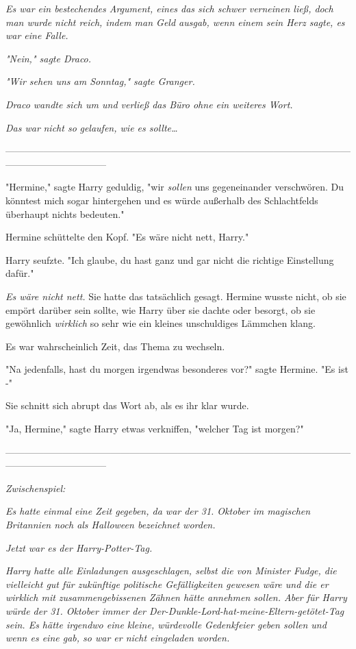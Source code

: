 {\emph{Es war ein bestechendes Argument, eines das sich schwer verneinen ließ, doch man wurde nicht reich, indem man Geld ausgab, wenn einem sein Herz sagte, es war eine Falle.}

\emph{"Nein," sagte Draco.}

\emph{"Wir sehen uns am Sonntag," sagte Granger.}

\emph{Draco wandte sich um und verließ das Büro ohne ein weiteres Wort.}

\emph{Das war} \emph{\emph{nicht so}} \emph{gelaufen, wie es sollte…}

--------------------------------------------------------------------------------------------------------------------------------------------

"Hermine," sagte Harry geduldig, "wir \emph{sollen} uns gegeneinander verschwören. Du könntest mich sogar hintergehen und es würde außerhalb des Schlachtfelds überhaupt nichts bedeuten."

Hermine schüttelte den Kopf. "Es wäre nicht nett, Harry."

Harry seufzte. "Ich glaube, du hast ganz und gar nicht die richtige Einstellung dafür."

\emph{Es wäre nicht nett.} Sie hatte das tatsächlich gesagt. Hermine wusste nicht, ob sie empört darüber sein sollte, wie Harry über sie dachte oder besorgt, ob sie gewöhnlich \emph{wirklich} so sehr wie ein kleines unschuldiges Lämmchen klang.

Es war wahrscheinlich Zeit, das Thema zu wechseln.

"Na jedenfalls, hast du morgen irgendwas besonderes vor?" sagte Hermine. "Es ist -"

Sie schnitt sich abrupt das Wort ab, als es ihr klar wurde.

"Ja, Hermine," sagte Harry etwas verkniffen, "welcher Tag ist morgen?"

--------------------------------------------------------------------------------------------------------------------------------------------

\emph{\emph{Zwischenspiel:}}

\emph{Es hatte einmal eine Zeit gegeben, da war der 31. Oktober im magischen Britannien noch als Halloween bezeichnet worden.}

\emph{Jetzt war es der Harry-Potter-Tag.}

\emph{Harry hatte alle Einladungen ausgeschlagen, selbst die von Minister Fudge, die vielleicht gut für zukünftige politische Gefälligkeiten gewesen wäre und die er wirklich mit zusammengebissenen Zähnen hätte annehmen sollen. Aber für Harry würde der 31. Oktober immer der Der-Dunkle-Lord-hat-meine-Eltern-getötet-Tag sein. Es hätte irgendwo eine kleine, würdevolle Gedenkfeier geben sollen und wenn es eine gab, so war er nicht eingeladen worden.}

}
